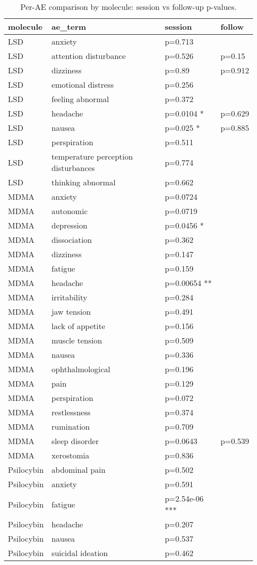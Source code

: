 \begin{table}[ht]
\centering
\caption{Per-AE comparison by molecule: session vs follow-up p-values.}
\label{tab:cmp_ae_molecule}
\begin{tabular}{llll}
\toprule
molecule & ae_term & session & follow \\
\midrule
LSD & anxiety & p=0.713  &  \\
LSD & attention disturbance & p=0.526  & p=0.15  \\
LSD & dizziness & p=0.89  & p=0.912  \\
LSD & emotional distress & p=0.256  &  \\
LSD & feeling abnormal & p=0.372  &  \\
LSD & headache & p=0.0104 * & p=0.629  \\
LSD & nausea & p=0.025 * & p=0.885  \\
LSD & perspiration & p=0.511  &  \\
LSD & temperature perception disturbances & p=0.774  &  \\
LSD & thinking abnormal & p=0.662  &  \\
MDMA & anxiety & p=0.0724  &  \\
MDMA & autonomic & p=0.0719  &  \\
MDMA & depression & p=0.0456 * &  \\
MDMA & dissociation & p=0.362  &  \\
MDMA & dizziness & p=0.147  &  \\
MDMA & fatigue & p=0.159  &  \\
MDMA & headache & p=0.00654 ** &  \\
MDMA & irritability & p=0.284  &  \\
MDMA & jaw tension & p=0.491  &  \\
MDMA & lack of appetite & p=0.156  &  \\
MDMA & muscle tension & p=0.509  &  \\
MDMA & nausea & p=0.336  &  \\
MDMA & ophthalmological & p=0.196  &  \\
MDMA & pain & p=0.129  &  \\
MDMA & perspiration & p=0.072  &  \\
MDMA & restlessness & p=0.374  &  \\
MDMA & rumination & p=0.709  &  \\
MDMA & sleep disorder & p=0.0643  & p=0.539  \\
MDMA & xerostomia & p=0.836  &  \\
Psilocybin & abdominal pain & p=0.502  &  \\
Psilocybin & anxiety & p=0.591  &  \\
Psilocybin & fatigue & p=2.54e-06 *** &  \\
Psilocybin & headache & p=0.207  &  \\
Psilocybin & nausea & p=0.537  &  \\
Psilocybin & suicidal ideation & p=0.462  &  \\
\bottomrule
\end{tabular}
\end{table}

